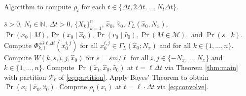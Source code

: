 \documentclass[letterpaper,10pt,conference]{ieeeconf}
\begin{document}
\begin{algorithm}[t]
		  \caption{Algorithm to compute  $\rho_t$ for each $t \in  \{\Delta t, 2 \Delta t, \dots, N_t \Delta t$\}.}
		  \label{alg:1}
		  \begin{algorithmic}[1]
		    \Require $\bar{s} > 0$, $N_t \in \mathbb{N}$, $\Delta t > 0$,  $ \{ X_k \}_{k=1}^{n}$, $\hat{x}_0$, $\hat{v}_0$, $\Gamma_L( \hat{x}_0, N_x)$, $\Pr(x_0 \mid M), \Pr(x_0 \mid \hat{x}_0), \Pr(v_0 \mid \hat{v}_0 ), \Pr(M \in \mathcal{M}), \text{ and } \Pr(s \mid k)$.
		    \State Compute $\Phi_{k,1}^{ \pm \bar{s} \ell \Delta t}( x_0^{i,j} )$ for all $x_0^{i,j} \in \Gamma_L( \hat{x}_0 ; N_x)$ and \hspace*{12pt} for all $k \in  \{1,\dots, n\}$.
		    \State Compute $W(k,s,i,j,\hat{x}_0)$ for $s = \bar{s} m / \ell$ for all \hspace*{28pt} $i,j\in \{-N_x,\dots, N_x\}$ and $k\in \{1,\dots,n\}$.
		    \EndFor  
		    \State Compute $\Pr(\check{x}_t, \hat{x}_0, \hat{v}_0)$ at $t=\ell \Delta t$ via Theorem \ref{thm:main} 
		    \hspace*{12pt} with partition $\mathcal{P}_\ell$ of \eqref{eq:partition}.\label{alg1:step2}
		    \State Apply Bayes' Theorem to obtain $\Pr(\check{x}_t \mid \hat{x}_0, \hat{v}_0)$.
		    \State Compute $\rho_t(x_t)$ at $t= \ell \cdot \Delta t$ via \eqref{eq:convolve}.
		    \EndFor
		  \end{algorithmic}
\end{algorithm}

\end{document}
